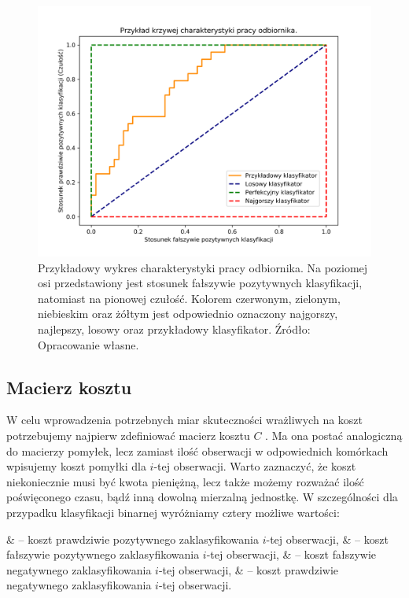\documentclass[inzynierska]{pwr_wmat_praca_dyplomowa}
\theoremstyle{plain}
\numberwithin{theorem}{chapter}
\theoremstyle{definition}
\numberwithin{theorem}{chapter}
\begin{document}
\begin{figure}[h]
	\includegraphics[width=\linewidth]{images/roc_example.png}
	\caption{Przykładowy wykres charakterystyki pracy odbiornika. Na poziomej osi przedstawiony jest stosunek fałszywie pozytywnych klasyfikacji, natomiast na pionowej czułość. Kolorem czerwonym, zielonym, niebieskim oraz żółtym jest odpowiednio oznaczony najgorszy, najlepszy, losowy oraz przykładowy klasyfikator. Źródło: Opracowanie własne.}
	\label{fig:roc_example}
\end{figure}

\subsection{Macierz kosztu}
\label{sec:macierz-kosztu}
W celu wprowadzenia potrzebnych miar skuteczności wrażliwych na koszt potrzebujemy najpierw zdefiniować macierz kosztu $C$ \cite{CSCCFD, CS-Learning}. Ma ona postać analogiczną do macierzy pomyłek, lecz zamiast ilość obserwacji w odpowiednich komórkach wpisujemy koszt pomyłki dla $i$-tej obserwacji. Warto zaznaczyć, że koszt niekoniecznie musi być kwota pieniężną, lecz także możemy rozważać ilość poświęconego czasu, bądź inną dowolną mierzalną jednostkę. W szczególności dla przypadku klasyfikacji binarnej wyróżniamy cztery możliwe wartości:
\begin{myitemize}
	&  -- koszt prawdziwie pozytywnego zaklasyfikowania $i$-tej obserwacji,
	&  -- koszt fałszywie pozytywnego zaklasyfikowania $i$-tej obserwacji,
	&  -- koszt fałszywie negatywnego zaklasyfikowania $i$-tej obserwacji,
	&  -- koszt prawdziwie negatywnego zaklasyfikowania $i$-tej obserwacji.
\end{myitemize}
\end{document}

